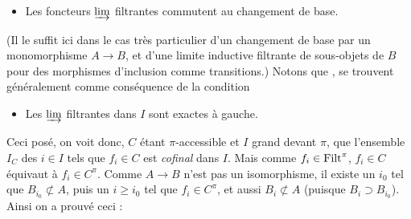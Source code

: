 \begin{itemize}
\item[\cercle{e$'$}] Les foncteurs $\varinjlim$ filtrantes commutent au changement de base.
\end{itemize}

(Il le suffit ici dans le cas très particulier d'un changement de base par un monomorphisme $A \longrightarrow B$, et d'une limite inductive filtrante de sous-objets de $B$ pour des morphismes d'inclusion comme transitions.) Notons que ,  se trouvent généralement comme conséquence de la condition %

\begin{itemize}
\item[(e$_0$)] Les $\varinjlim$ filtrantes dans $I$ sont exactes à gauche.
\end{itemize}

Ceci posé, on voit donc, $C$ étant $\pi$-accessible et $I$ grand devant $\pi$, que l'ensemble $I_C$ des $i \in I$ tels que $f_i \in C$ est \textit{cofinal} dans $I$. Mais comme $f_i \in \mathrm{Filt}^{\pi}$, $f_i \in C$ équivaut à $f_i \in C^{\pi}$. Comme $A \longrightarrow B$ n'est pas un isomorphisme, il existe un $i_0$ tel que $B_{i_0} \not\subset A$, puis un $i \geq i_0$ tel que $f_i \in C^{\pi}$, et aussi $B_i \not\subset A$ (puisque $B_i \supset B_{i_0}$). Ainsi on a prouvé ceci :

